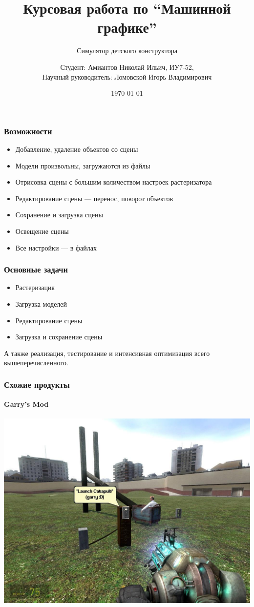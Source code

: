 \documentclass{beamer}
\title[Машинная графика]{Курсовая работа по ``Машинной графике''}
\subtitle{Симулятор детского конструктора}
\author{Студент: {Амиантов Николай Ильич, ИУ7-52}, \\
Научный руководитель: {Ломовской Игорь Владимирович}}
\date{\today}
\begin{document}
\frame{\titlepage}

\begin{frame}
\frametitle{Возможности}

\begin{itemize}
\item Добавление, удаление объектов со сцены
\item Модели произвольны, загружаются из файлы
\item Отрисовка сцены с большим количеством настроек растеризатора
\item Редактирование сцены --- перенос, поворот объектов
\item Сохранение и загрузка сцены
\item Освещение сцены
\item Все настройки --- в файлах
\end{itemize}
\end{frame}

\begin{frame}
\frametitle{Основные задачи}

\begin{itemize}
\item Растеризация
\item Загрузка моделей
\item Редактирование сцены
\item Загрузка и сохранение сцены
\end{itemize}
А также реализация, тестирование и интенсивная оптимизация всего вышеперечисленного.
\end{frame}

\begin{frame}
\frametitle{Схожие продукты}
\framesubtitle{Garry's Mod}

\centering
\includegraphics[width=\textwidth]{garrysmod}
\end{frame}
\end{document}
